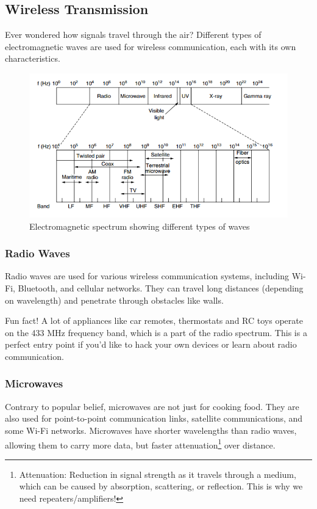 \vspace{1em}

\subsection*{Wireless Transmission}
Ever wondered how signals travel through the air? Different types of electromagnetic waves are used for wireless communication, each with its own characteristics.

\begin{figure}[h]
    \centering
    \includegraphics[width=.8\textwidth]{assets/osi/physical/spectrum.png}
    \caption{Electromagnetic spectrum showing different types of waves}\label{fig:em_spectrum}
\end{figure}

\subsubsection*{Radio Waves}
Radio waves are used for various wireless communication systems, including Wi-Fi, Bluetooth, and cellular networks. They can travel long distances (depending on wavelength) and penetrate through obstacles like walls.

\begin{noteblock}
    Fun fact! A lot of appliances like car remotes, thermostats and RC toys operate on the 433 MHz frequency band, which is a part of the radio spectrum. This is a perfect entry point if you'd like to hack your own devices or learn about radio communication.
\end{noteblock}

\subsubsection*{Microwaves}
Contrary to popular belief, microwaves are not just for cooking food. They are also used for point-to-point communication links, satellite communications, and some Wi-Fi networks. Microwaves have shorter wavelengths than radio waves, allowing them to carry more data, but faster attenuation\footnote{
    Attenuation: Reduction in signal strength as it travels through a medium, which can be caused by absorption, scattering, or reflection. 
    This is why we need repeaters/amplifiers!
} over distance.

